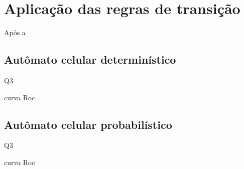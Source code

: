 \chapter{Aplicação das regras de transição}

Após a 

\section{Autômato celular determinístico}

Q3

curva Roc

\section{Autômato celular probabilístico}

Q3

curva Roc
